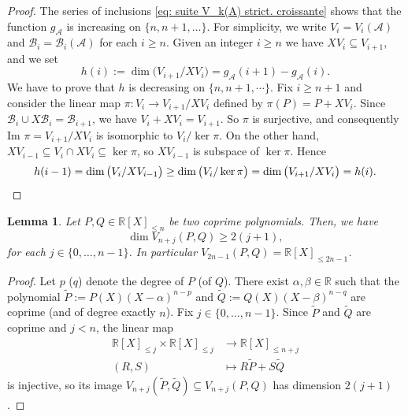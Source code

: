 \documentclass[10pt,a4paper]{amsart}
\numberwithin{equation}{section}
\newcommand\bR{\mathbb{R}}
\newcommand\cA{\mathcal{A}}
\newcommand\cB{\mathcal{B}}
\newcommand\tP{\widetilde{P}}
\newcommand\tQ{\widetilde{Q}}
\let\subset \subseteq
\theoremstyle{definition}
\theoremstyle{plain}
\newtheorem{Lem}[Def]{Lemma}
\begin{document}
\begin{proof}
The series of inclusions \eqref{eq: suite V_k(A) strict. croissante} shows that the function $g_\cA$ is increasing on $\{n,n+1,\dots\}$. For simplicity, we write $V_i=V_{i}(\cA)$ and $\cB_{i} = \cB_{i}(\cA)$ for each $i \geq n$. Given an integer $i\geq n$ we have $XV_{i}\subset V_{i+1}$, and we set
\[
h(i):= \dim \big(V_{i+1}/XV_{i}\big) = g_\cA(i+1)-g_\cA(i).
\]
We have to prove that $h$ is decreasing on $\{n,n+1,\cdots\}$. Fix $i\geq n+1$ and consider the linear map $\pi : V_i \to V_{i+1}/XV_{i}$ defined by $\pi(P) = P + XV_{i}$. Since $\cB_{i}\cup X\cB_{i} = \cB_{i+1}$, we have $V_i + XV_i = V_{i+1}$. So $\pi$ is surjective, and consequently $\textrm{Im } \pi = V_{i+1}/XV_{i}$ is isomorphic to $V_i / \ker \pi$.
On the other hand, $XV_{i-1}\subset V_{i} \cap XV_{i} \subset \ker\pi$, so $XV_{i-1}$ is subspace of $\ker \pi$. Hence
\begin{equation*}
h(i-1) = \dim \big(V_{i}/XV_{i-1}\big) \geq \dim\big(V_i / \ker \pi \big) = \dim \big(V_{i+1}/XV_{i}\big) = h(i).\qedhere
\end{equation*}
\end{proof}

\begin{Lem}
\label{lem : dim V_n+j(P,Q)}
Let $P,Q \in \bR[X]_{\leq n}$ be two coprime polynomials. Then, we have
\begin{equation*}
\dim V_{n+j}(P,Q) \geq 2(j+1),
\end{equation*}
for each $j\in\{0,\dots,n-1\}$. In particular $V_{2n-1}(P,Q) = \bR[X]_{\leq 2n-1}$.
\end{Lem}

\begin{proof}
Let $p$ (\resp $q$) denote the degree of $P$ (\resp of $Q$). There exist $\alpha,\beta\in\bR$ such that the polynomial $\tP := P(X)(X-\alpha)^{n-p}$ and $\tQ:= Q(X)(X-\beta)^{n-q}$ are coprime (and of degree exactly $n$). Fix $j\in\{0,\dots,n-1\}$. Since $\tP$ and $\tQ$ are coprime and $j<n$, the linear map
\begin{align*}
\bR[X]_{\leq j}\times \bR[X]_{\leq j} & \longrightarrow \bR[X]_{\leq n+j} \\
(R,S) & \longmapsto R\tP + S\tQ
\end{align*}
is injective, so its image $V_{n+j}(\tP,\tQ) \subset V_{n+j}(P,Q)$ has dimension $2(j+1)$.
\end{proof}
\end{document}
